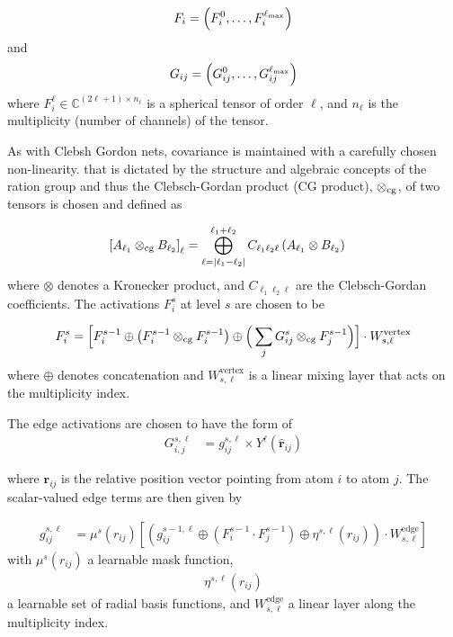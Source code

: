 \documentclass[book.tex]{subfiles}
\begin{document}
\begin{align}
F_{i}=\left(F_{i}^{0},\ldots,F_{i}^{\ell_{{\rm max}}}\right)
\end{align}
and 
\begin{align}
G_{ij}=\left(G_{ij}^{0},\ldots,G_{ij}^{\ell_{{\rm max}}}\right)
\end{align}
where $F_{i}^{\ell}\in\mathbb{C}^{\left(2\ell+1\right)\times n_{\ell}}$ is a spherical tensor of order $\ell$, and $n_{\ell}$ is the multiplicity (number of channels) of the tensor. 

As with Clebsh Gordon nets, covariance is maintained with a carefully chosen non-linearity. that is dictated by the structure and algebraic concepts of the ration group and thus the Clebsch-Gordan product (CG product), $\otimes_{{\rm cg}}$, of two tensors is chosen and defined as 

\begin{align}
\left[A_{\ell_{1}}\otimes_{{\rm cg}}B_{\ell_{2}}\right]_{\ell} &=\bigoplus_{\ell=\left|\ell_{1}-\ell_{2}\right|}^{\ell_{1}+\ell_{2}}C_{\ell_{1}\ell_{2}\ell}\left(A_{\ell_{1}}\otimes B_{\ell_{2}}\right)
\end{align}
where $\otimes$ denotes a Kronecker product, and $C_{\ell_{1}\ell_{2}\ell}$ are the Clebsch-Gordan coefficients. The activations $F_{i}^{s}$ at level $s$ are chosen to be

\begin{align}
F_{i}^{s}=\Big[F_{i}^{s-1}\oplus\big(F_{i}^{s-1}\otimes_{{\rm cg}}F_{i}^{s-1}\big)\oplus\Big(\sum_{j}G_{ij}^{s}\otimes_{{\rm cg}}F_{j}^{s-1}\Big)\Big]\cdot W_{s,\ell}^{\text{vertex}}
\end{align}
where $\oplus$ denotes concatenation and $W_{s,\ell}^{\text{vertex}}$
is a linear mixing layer that acts on the multiplicity index. 

The edge activations are chosen to have the form of 
\begin{align}
G_{i,j}^{s,\ell} &=g_{ij}^{s,\ell}\times Y^{\ell}\left(\hat{\mathbf{r}}_{ij}\right)
\end{align}

where $\mathbf{r}_{ij}$ is the relative position vector pointing from atom $i$ to atom $j$. The scalar-valued edge terms are then given by

\begin{align}
g_{ij}^{s,\ell} &= \mu^{s}\left(r_{ij}\right)\left[\left(g_{ij}^{s-1,\ell}\oplus\left(F_{i}^{s-1}\cdot F_{j}^{s-1}\right)\oplus\eta^{s,\ell}\left(r_{ij}\right)\right)\cdot W_{s,\ell}^{\text{edge}}\right]
\end{align}
with $\mu^{s}\left(r_{ij}\right)$ a learnable mask function, 
\begin{align}
\eta^{s,\ell}\left(r_{ij}\right)
\end{align}
a learnable set of radial basis functions, and $W_{s,\ell}^{\text{edge}}$ a linear layer along the multiplicity index.
\end{document}

